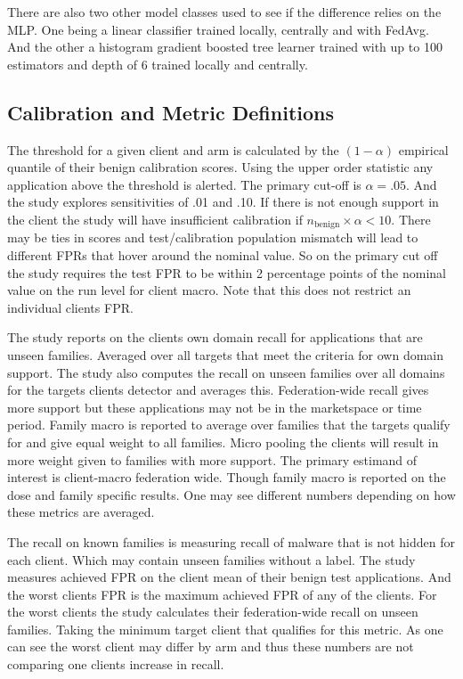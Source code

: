 \documentclass[12pt,letterpaper]{article}
\begin{document}
There are also two other model classes used to see if the difference relies on the MLP. One being a linear classifier trained locally, centrally and with FedAvg. And the other a histogram gradient boosted tree learner trained with up to 100 estimators and depth of 6 trained locally and centrally.

\subsection*{Calibration and Metric Definitions} 

The threshold for a given client and arm is calculated by the $(1-\alpha)$ empirical quantile of their benign calibration scores. Using the upper order statistic any application above the threshold is alerted. The primary cut-off is $\alpha = .05$. And the study explores sensitivities of .01 and .10. If there is not enough support in the client the study will have insufficient calibration if $n_{\mathrm{benign}} \times \alpha < 10$. There may be ties in scores and test/calibration population mismatch will lead to different FPRs that hover around the nominal value. So on the primary cut off the study requires the test FPR to be within 2 percentage points of the nominal value on the run level for client macro. Note that this does not restrict an individual clients FPR.

The study reports on the clients own domain recall for applications that are unseen families. Averaged over all targets that meet the criteria for own domain support. The study also computes the recall on unseen families over all domains for the targets clients detector and averages this. Federation-wide recall gives more support but these applications may not be in the marketspace or time period. Family macro is reported to average over families that the targets qualify for and give equal weight to all families. Micro pooling the clients will result in more weight given to families with more support. The primary estimand of interest is client-macro federation wide. Though family macro is reported on the dose and family specific results. One may see different numbers depending on how these metrics are averaged.

The recall on known families is measuring recall of malware that is not hidden for each client. Which may contain unseen families without a label. The study measures achieved FPR on the client mean of their benign test applications. And the worst clients FPR is the maximum achieved FPR of any of the clients. For the worst clients the study calculates their federation-wide recall on unseen families. Taking the minimum target client that qualifies for this metric. As one can see the worst client may differ by arm and thus these numbers are not comparing one clients increase in recall.
\end{document}
